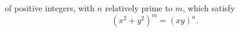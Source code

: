 of positive integers, with $n$ relatively prime to $m$, which satisfy
\[
(x^2 + y^2)^m = (xy)^n.
\]
